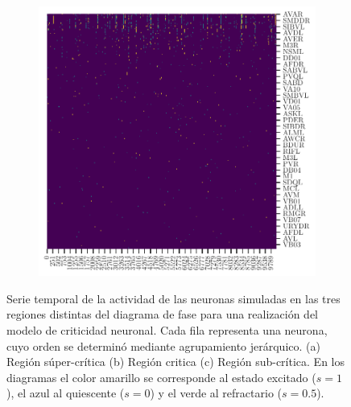 \begin{figure}
\begin{subfigure}[b]{0.3\textwidth}
		\caption{}
		\label{fig:cluster_critico}
	\end{subfigure}
	\begin{subfigure}[b]{0.3\textwidth}
		\centering
		\includegraphics[width=\textwidth]{cluster_sub_critico}
		\caption{}
		\label{fig:cluster_subcritico}
	\end{subfigure}
	\caption[Serie temporal de la actividad de las neuronas simuladas en las tres regiones distintas del diagrama de fase del para una realización del modelo de criticidad neuronal.]{ Serie temporal de la actividad de las neuronas simuladas en las tres regiones distintas del diagrama de fase para una realización  del modelo de criticidad neuronal. Cada fila representa una neurona, cuyo orden se determinó mediante agrupamiento jerárquico. (a) Región súper-crítica  (b) Región critica (c) Región sub-crítica. En los diagramas el color amarillo se corresponde al estado excitado ($s=1$), el azul al  quiescente ($s=0$) y el verde al refractario ($s=0.5$). }\label{fig:series_simulacion}
\end{figure}



